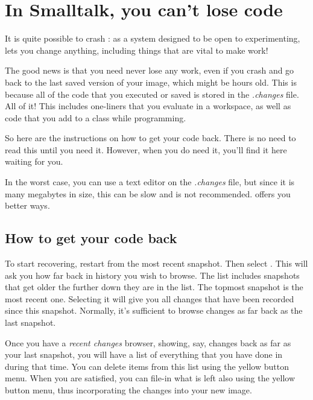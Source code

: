 \documentclass[a4paper,10pt,twoside]{book}
\begin{document}
\section{In Smalltalk, you can't lose code}
\label{sec:cantLoseCode} %

It is quite possible to crash \sq: as a system designed to be open to experimenting, \sq lets you change anything, including things that are vital to make \sq work!


The good news is that you need never lose any work, even if you crash and go back to the last saved version of your image, which might be hours old.
This is because all of the code that you executed or saved is stored in the \emph{.changes} file.
All of it!
This includes one-liners that you evaluate in a workspace, as well as code that you add to a class while programming.

So here are the instructions on how to get your code back.
There is no need to read this until you need it.
However, when you do need it, you'll find it here waiting for you.

In the worst case, you can use a text editor on the \emph{.changes} file, but since it is many megabytes in size, this can be slow and is not recommended.
\sq offers you better ways.

\subsection{How to get your code back}
To start recovering, restart \sq from the most recent snapshot. Then select . This will ask you how far back in history you wish to browse. The list includes snapshots that get older the further down they are in the list. The topmost snapshot is the most recent one. Selecting it will give you all changes that have been recorded since this snapshot.
Normally, it's sufficient to browse changes as far back as the last snapshot.

Once you have a \emph{recent changes} browser, showing, say, changes back as far as your last snapshot, you will have a list of everything that you have done in \sq during that time.
You can delete items from this list using the yellow button menu.
When you are satisfied, you can file-in what is left also using the yellow button menu, thus incorporating the changes into your new image.
\end{document}
